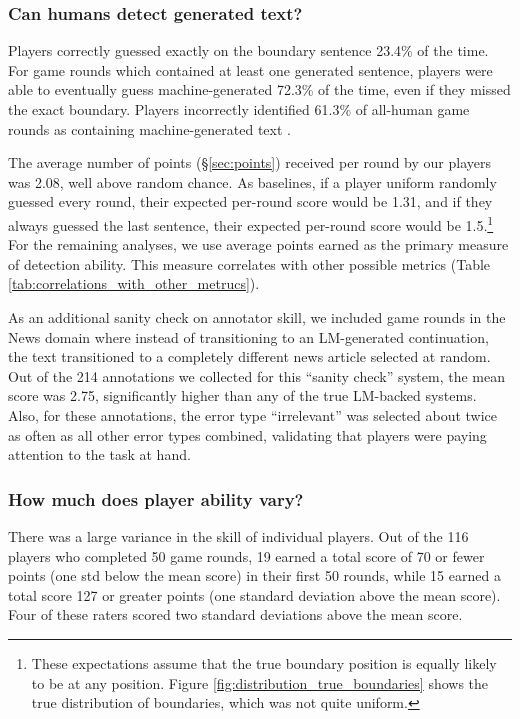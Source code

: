 \subsubsection{Can humans detect generated text?}
Players correctly guessed exactly on the boundary sentence 23.4\% of the time.
For game rounds which contained at least one generated sentence, players were able to eventually guess machine-generated 72.3\% of the time, even if they missed the exact boundary. %
Players incorrectly identified 61.3\% of all-human game rounds as containing machine-generated text .

The average number of points (\S\ref{sec:points}) received per round by our players was 2.08, well above random chance.
As baselines, if a player uniform randomly guessed every round, their expected per-round score would be 1.31, and
if they always guessed the last sentence, their expected per-round score would be 1.5.\footnote{These expectations assume that the true boundary position is equally likely to be at any position. Figure \ref{fig:distribution_true_boundaries} shows the true distribution of boundaries, which was not quite uniform.}
For the remaining analyses, we use average points earned as the primary measure of detection ability.
This measure correlates with other possible metrics (Table \ref{tab:correlations_with_other_metrucs}).

As an additional sanity check on annotator skill, we included game rounds in the News domain where instead of transitioning to an LM-generated continuation, the text transitioned to a completely different news article selected at random.
Out of the 214 annotations we collected for this ``sanity check'' system, the mean score was 2.75, significantly higher than any of the true LM-backed systems.
Also, for these annotations, the error type ``irrelevant'' was selected about twice as often as all other error types combined, validating that players were paying attention to the task at hand.

\subsubsection{How much does player ability vary?}
There was a large variance in the skill of individual players.
Out of the 116 players who completed 50 game rounds, 19 earned a total score of 70 or fewer points (one std below the mean score) in their first 50 rounds, while 15 earned a total score 127 or greater points (one standard deviation above the mean score). Four of these raters scored two standard deviations above the mean score.

